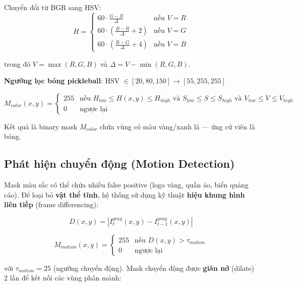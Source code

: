 \documentclass[12pt,a4paper]{article}
\begin{document}
Chuyển đổi từ BGR sang HSV:
\begin{equation}
H = \begin{cases}
    60 \cdot \frac{G-B}{\Delta} & \text{nếu } V = R \\
    60 \cdot \left(\frac{B-R}{\Delta} + 2\right) & \text{nếu } V = G \\
    60 \cdot \left(\frac{R-G}{\Delta} + 4\right) & \text{nếu } V = B
\end{cases}
\end{equation}

trong đó $V = \max(R,G,B)$ và $\Delta = V - \min(R,G,B)$.

\textbf{Ngưỡng lọc bóng pickleball}: HSV $\in [20, 80, 150] \to [55, 255, 255]$

\begin{equation}
M_{color}(x,y) = \begin{cases}
    255 & \text{nếu } H_{low} \leq H(x,y) \leq H_{high} \text{ và } S_{low} \leq S \leq S_{high} \text{ và } V_{low} \leq V \leq V_{high} \\
    0 & \text{ngược lại}
\end{cases}
\end{equation}

Kết quả là binary mask $M_{color}$ chứa vùng có màu vàng/xanh lá --- ứng cử viên là bóng.

\subsection{Phát hiện chuyển động (Motion Detection)}
\label{sec:motion}

Mask màu sắc có thể chứa nhiều false positive (logo vàng, quần áo, biển quảng cáo). Để loại bỏ \textbf{vật thể tĩnh}, hệ thống sử dụng kỹ thuật \textbf{hiệu khung hình liên tiếp} (frame differencing):

\begin{equation}
D(x,y) = |I_t^{gray}(x,y) - I_{t-1}^{gray}(x,y)|
\end{equation}

\begin{equation}
M_{motion}(x,y) = \begin{cases}
    255 & \text{nếu } D(x,y) > \tau_{motion} \\
    0 & \text{ngược lại}
\end{cases}
\end{equation}

với $\tau_{motion} = 25$ (ngưỡng chuyển động). Mask chuyển động được \textbf{giãn nở} (dilate) 2 lần để kết nối các vùng phân mảnh:
\end{document}
